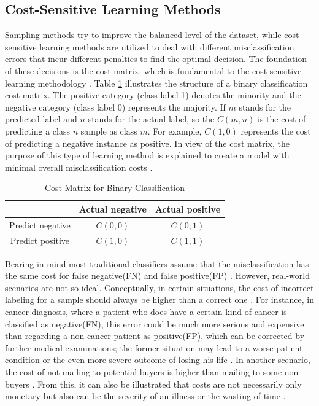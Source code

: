 \subsection{Cost-Sensitive Learning Methods}
Sampling methods try to improve the balanced level of the dataset, while cost-sensitive learning methods are utilized to deal with different misclassification errors that incur different penalties to find the optimal decision. The foundation of these decisions is the cost matrix, which is fundamental to the cost-sensitive learning methodology \cite{17,18}. Table \ref{tab1} illustrates the structure of a binary classification cost matrix. The positive category (class label 1) denotes the minority and the negative category (class label 0) represents the majority. If $m$ stands for the predicted label and $n$ stands for the actual label, so the $C(m, n)$ is the cost of predicting a class $n$ sample as class $m$. For example, $C(1,0)$ represents the cost of predicting a negative instance as positive. In view of the cost matrix, the purpose of this type of learning method is explained to create a model with minimal overall misclassification costs \cite{19,20}.
\begin{table}[h]
    \centering
    \begin{tabular}{|c|c|c|}
    \hline
                     & Actual negative & Actual positive \\ \hline
    Predict negative & $C(0,0)$        & $C(0,1)$        \\ \hline
    Predict positive & $C(1,0)$        & $C(1,1)$        \\ \hline
    \end{tabular}
    \caption{Cost Matrix for Binary Classification}
    \label{tab1}
\end{table}

Bearing in mind most traditional classifiers assume that the misclassification has the same cost for false negative(FN) and false positive(FP) \cite{18}. However, real-world scenarios are not so ideal. Conceptually, in certain situations, the cost of incorrect labeling for a sample should always be higher than a correct one \cite{18}. For instance, in cancer diagnosis, where a patient who does have a certain kind of cancer is classified as negative(FN), this error could be much more serious and expensive than regarding a non-cancer patient as positive(FP), which can be corrected by further medical examinations; the former situation may lead to a worse patient condition or the even more severe outcome of losing his life \cite{21}. In another scenario, the cost of not mailing to potential buyers is higher than mailing to some non-buyers  \cite{19}. From this, it can also be illustrated that costs are not necessarily only monetary but also can be the severity of an illness or the wasting of time \cite{18}. 

